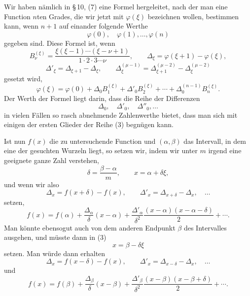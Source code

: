 \documentclass[11pt]{article}
\begin{document}
Wir haben nämlich in \S\,10, (7) eine Formel hergeleitet, nach der man eine Function $n$ten Grades, die wir jetzt mit $\varphi(\xi)$ bezeichnen wollen, bestimmen kann, wenn $n+1$ auf einander folgende Werthe
\[
        \varphi(0),\quad \varphi(1),\ldots,\varphi(n)
\]
gegeben sind. Diese Formel ist, wenn
\begin{equation}
        B_\nu^{(\xi)}=
        \frac{\xi(\xi-1)\cdots(\xi-\nu+1)}
             {1\cdot2\cdot3\cdots\nu},\qquad
        \Delta_\xi=\varphi(\xi+1)-\varphi(\xi),
\tag{1}
\end{equation}
\[
        \Delta'_\xi=\Delta_{\xi+1}-\Delta_\xi,\qquad
        \Delta_\xi^{(\mu-1)}
        =\Delta_{\xi+1}^{(\mu-2)}-\Delta_\xi^{(\mu-2)}
\tag{2}
\]
gesetzt wird,
\begin{equation}
        \varphi(\xi)=\varphi(0)+
        \Delta_0B_1^{(\xi)}+\Delta'_0B_2^{(\xi)}
        +\cdots+\Delta_0^{(n-1)}B_n^{(\xi)}.
\tag{3}
\end{equation}
Der Werth der Formel liegt darin, dass die Reihe der Differenzen
\[
        \Delta_0,\quad \Delta'_0,\quad \Delta''_0,\ldots
\]
in vielen Fällen so rasch abnehmende Zahlenwerthe bietet, dass man sich mit einigen der ersten Glieder der Reihe (3) begnügen kann.

Ist nun $f(x)$ die zu untersuchende Function und $(\alpha,\beta)$ das Intervall, in dem eine der gesuchten Wurzeln liegt, so setzen wir, indem wir unter $m$ irgend eine geeignete ganze Zahl verstehen,
\[
        \delta=\frac{\beta-\alpha}{m},\qquad x=\alpha+\delta\xi,
\]
und wenn wir also
\[
        \Delta_x=f(x+\delta)-f(x),\qquad
        \Delta'_x=\Delta_{x+\delta}-\Delta_x,\quad\ldots
\]
setzen,
\begin{equation}
        f(x)=f(\alpha)+\frac{\Delta_\alpha}{\delta}(x-\alpha)
        +\frac{\Delta'_\alpha}{\delta^2}
          \frac{(x-\alpha)(x-\alpha-\delta)}{2}+\cdots .
\tag{4}
\end{equation}
Man könnte ebensogut auch von dem anderen Endpunkt $\beta$ des Intervalles ausgehen, und müsste dann in (3)
\[
        x=\beta-\delta\xi
\]
setzen. Man würde dann erhalten
\[
        \Delta_x=f(x-\delta)-f(x),\qquad
        \Delta'_x=\Delta_{x-\delta}-\Delta_x,\quad\ldots
\]
und
\begin{equation}
        f(x)=f(\beta)+\frac{\Delta_\beta}{\delta}(x-\beta)
        +\frac{\Delta'_\beta}{\delta^2}
          \frac{(x-\beta)(x-\beta+\delta)}{2}+\cdots .
\tag{5}
\end{equation}
\end{document}
